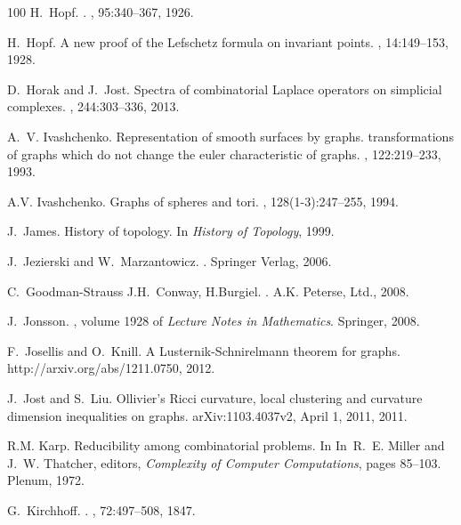 \documentclass[12pt]{amsart}
\begin{document}
\begin{thebibliography}{100}
H.~Hopf.
.
, 95:340--367, 1926.

H.~Hopf.
\newblock A new proof of the {Lefschetz} formula on invariant points.
, 14:149--153, 1928.

D.~Horak and J.~Jost.
\newblock Spectra of combinatorial {L}aplace operators on simplicial complexes.
, 244:303--336, 2013.

A.~V. Ivashchenko.
\newblock Representation of smooth surfaces by graphs. transformations of
  graphs which do not change the euler characteristic of graphs.
, 122:219--233, 1993.

A.V. Ivashchenko.
\newblock Graphs of spheres and tori.
, 128(1-3):247--255, 1994.

J.~James.
\newblock History of topology.
\newblock In {\em History of Topology}, 1999.

J.~Jezierski and W.~Marzantowicz.
.
\newblock Springer Verlag, 2006.

C.~Goodman-Strauss J.H.~Conway, H.Burgiel.
.
\newblock A.K. Peterse, Ltd., 2008.

J.~Jonsson.
, volume 1928 of {\em Lecture
  Notes in Mathematics}.
\newblock Springer, 2008.

F.~Josellis and O.~Knill.
\newblock A {L}usternik-{S}chnirelmann theorem for graphs.
\newblock \\http://arxiv.org/abs/1211.0750, 2012.

J.~Jost and S.~Liu.
\newblock Ollivier's {Ricci} curvature, local clustering and curvature
  dimension inequalities on graphs.
\newblock arXiv:1103.4037v2, April 1, 2011, 2011.

R.M. Karp.
\newblock Reducibility among combinatorial problems.
\newblock In In~R.~E. Miller and J.~W. Thatcher, editors, {\em Complexity of
  Computer Computations}, pages 85--103. Plenum, 1972.

G.~Kirchhoff.
.
, 72:497--508, 1847.


\end{thebibliography}
\end{document}
